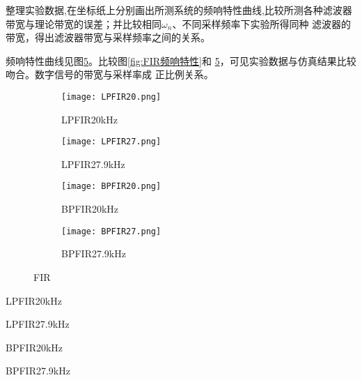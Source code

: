 \documentclass[../main]{subfiles}
\begin{document}
\begin{Exercise}

	整理实验数据,在坐标纸上分别画出所测系统的频响特性曲线,比较所测各种滤波器
	带宽与理论带宽的误差；并比较相同$ \omega_n $、不同采样频率下实验所得同种
	滤波器的带宽，得出滤波器带宽与采样频率之间的关系。

\end{Exercise}

\begin{Answer}

	频响特性曲线见图\ref{fig:FIR}。比较图\ref{fig:FIR频响特性}和
	\ref{fig:FIR}，可见实验数据与仿真结果比较吻合。数字信号的带宽与采样率成
	正比例关系。

\end{Answer}

\begin{figure}[htbp]
	\centering
	\begin{subfigure}[htbp]{.45\linewidth}
		\centering
		\texttt{[image: LPFIR20.png]}
		\caption{LPFIR20kHz}
		\label{fig:LPFIR20}
	\end{subfigure}
	\quad
	\begin{subfigure}[htbp]{.45\linewidth}
		\centering
		\texttt{[image: LPFIR27.png]}
		\caption{LPFIR27.9kHz}
		\label{fig:LPFIR27}
	\end{subfigure}

	\begin{subfigure}[htbp]{.45\linewidth}
		\centering
		\texttt{[image: BPFIR20.png]}
		\caption{BPFIR20kHz}
		\label{fig:BPFIR20}
	\end{subfigure}
	\quad
	\begin{subfigure}[htbp]{.45\linewidth}
		\centering
		\texttt{[image: BPFIR27.png]}
		\caption{BPFIR27.9kHz}
		\label{fig:BPFIR27}
	\end{subfigure}
	\caption{FIR}
	\label{fig:FIR}
\end{figure}

\begin{table}[htbp]
	\centering
	\caption{LPFIR20kHz}
	\label{tab:LPFIR20kHz}
\end{table}

\begin{table}[htbp]
	\centering
	\caption{LPFIR27.9kHz}
	\label{tab:LPFIR27.9kHz}
\end{table}

\begin{table}[htbp]
	\centering
	\caption{BPFIR20kHz}
	\label{tab:BPFIR20kHz}
\end{table}

\begin{table}[htbp]
	\centering
	\caption{BPFIR27.9kHz}
	\label{tab:BPFIR27.9kHz}
\end{table}
\end{document}
